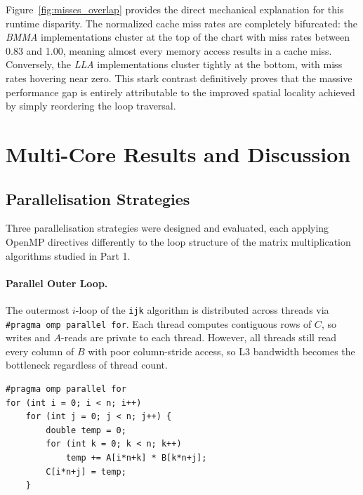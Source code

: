 \documentclass[12pt,a4paper]{article}
\begin{document}
Figure~\ref{fig:misses_overlap} provides the direct mechanical explanation for this runtime disparity. The normalized cache miss rates are 
completely bifurcated: the \textit{BMMA} implementations cluster at the top of the chart with miss rates between 0.83 and 1.00, meaning 
almost every memory access results in a cache miss. Conversely, the \textit{LLA} implementations cluster tightly at the bottom, with miss 
rates hovering near zero. This stark contrast definitively proves that the massive performance gap is entirely attributable to the improved 
spatial locality achieved by simply reordering the loop traversal.

\section{Multi-Core Results and Discussion}
\label{sec:multicore_results}

\subsection{Parallelisation Strategies}
\label{subsec:par_strategies}

Three parallelisation strategies were designed and evaluated, each applying
OpenMP directives differently to the loop structure of the matrix multiplication
algorithms studied in Part 1.

\paragraph{Parallel Outer Loop.}
The outermost $i$-loop of the \texttt{ijk} algorithm is distributed across
threads via \texttt{\#pragma omp parallel for}. Each thread computes
contiguous rows of $C$, so writes and $A$-reads are private to each thread.
However, all threads still read every column of $B$ with poor column-stride
access, so L3 bandwidth becomes the bottleneck regardless of thread count.

\begin{lstlisting}[style=cppstyle, caption={Parallel outer loop (\texttt{ijk})}]
#pragma omp parallel for
for (int i = 0; i < n; i++)
    for (int j = 0; j < n; j++) {
        double temp = 0;
        for (int k = 0; k < n; k++)
            temp += A[i*n+k] * B[k*n+j];
        C[i*n+j] = temp;
    }
\end{lstlisting}
\end{document}
